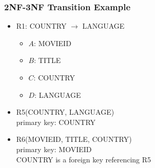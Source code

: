 \documentclass[dvipsnames]{beamer}
\begin{document}
\begin{frame}
  \frametitle{2NF-3NF Transition Example}

  \begin{example}
    \begin{itemize}
      \item R1: COUNTRY $\rightarrow$ LANGUAGE

      \pause
      \begin{itemize}
        \item $A$: MOVIEID
        \item $B$: TITLE
        \item $C$: COUNTRY
        \item $D$: LANGUAGE
      \end{itemize}
    \end{itemize}

    \pause
    \begin{itemize}
      \item R5(COUNTRY, LANGUAGE)\\
        primary key: COUNTRY

      \pause
      \item R6(MOVIEID, TITLE, COUNTRY)\\
        primary key: MOVIEID\\
        COUNTRY is a foreign key referencing R5
    \end{itemize}
  \end{example}
\end{frame}
\end{document}

